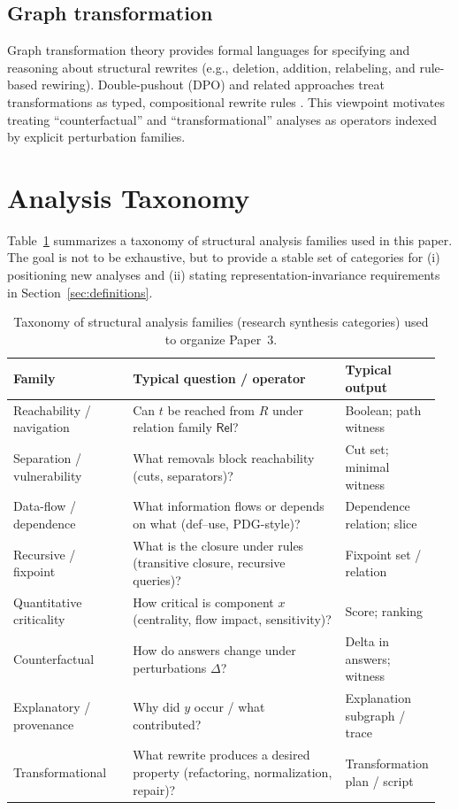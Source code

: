 \documentclass[11pt]{article}
\begin{document}
\subsection{Graph transformation}
Graph transformation theory provides formal languages for specifying and reasoning about structural rewrites (e.g., deletion, addition, relabeling, and rule-based rewiring). Double-pushout (DPO) and related approaches treat transformations as typed, compositional rewrite rules \cite{ehrig2006}. This viewpoint motivates treating ``counterfactual'' and ``transformational'' analyses as operators indexed by explicit perturbation families.

\section{Analysis Taxonomy}
\label{sec:analysis-taxonomy}
Table~\ref{tab:analysis-taxonomy} summarizes a taxonomy of structural analysis families used in this paper. The goal is not to be exhaustive, but to provide a stable set of categories for (i) positioning new analyses and (ii) stating representation-invariance requirements in Section~\ref{sec:definitions}.

\begin{table}[t]
\centering
\begin{tabular}{@{}p{0.28\linewidth}p{0.50\linewidth}p{0.18\linewidth}@{}}
\toprule
Family & Typical question / operator & Typical output \\
\midrule
Reachability / navigation & Can $t$ be reached from $R$ under relation family $\mathsf{Rel}$? & Boolean; path witness \\
Separation / vulnerability & What removals block reachability (cuts, separators)? & Cut set; minimal witness \\
Data-flow / dependence & What information flows or depends on what (def--use, PDG-style)? & Dependence relation; slice \\
Recursive / fixpoint & What is the closure under rules (transitive closure, recursive queries)? & Fixpoint set / relation \\
Quantitative criticality & How critical is component $x$ (centrality, flow impact, sensitivity)? & Score; ranking \\
Counterfactual & How do answers change under perturbations $\Delta$? & Delta in answers; witness \\
Explanatory / provenance & Why did $y$ occur / what contributed? & Explanation subgraph / trace \\
Transformational & What rewrite produces a desired property (refactoring, normalization, repair)? & Transformation plan / script \\
\bottomrule
\end{tabular}
\caption{Taxonomy of structural analysis families (research synthesis categories) used to organize Paper~3.}
\label{tab:analysis-taxonomy}
\end{table}
\end{document}
